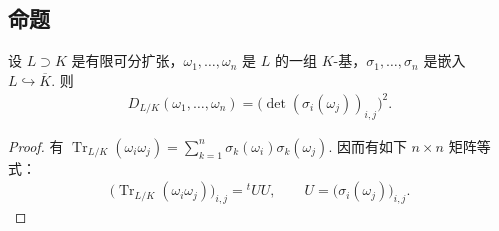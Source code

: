 \subsection{命题}\label{sec:nt-2-4-3}
\begin{proposition*}
设 $L\supset K$ 是有限可分扩张，$\omega_1,\ldots,\omega_n$ 是 $L$ 的一组 $K$-基，$\sigma_1,\ldots,\sigma_n$ 是嵌入 $L\hookrightarrow\overline K$. 则
\begin{align*}
D_{L/K}(\omega_1,\ldots,\omega_n)=\bigl(\det(\sigma_i(\omega_j))_{i,j}\bigr)^2.
\end{align*}
\end{proposition*}
\begin{proof}
有 $\operatorname{Tr}_{L/K}(\omega_i\omega_j)=\sum_{k=1}^n\sigma_k(\omega_i)\sigma_k(\omega_j)$. 因而有如下 $n\times n$ 矩阵等式：
\begin{align*}
\bigl(\operatorname{Tr}_{L/K}(\omega_i\omega_j)\bigr)_{i,j}
={}^{t}\!UU,\qquad U=\bigl(\sigma_i(\omega_j)\bigr)_{i,j}.
\end{align*}
\end{proof}

